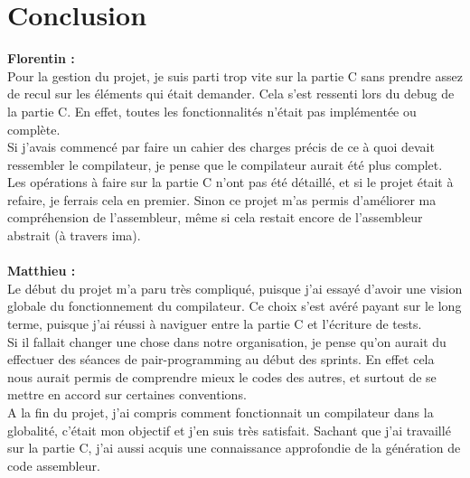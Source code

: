 \documentclass{article}
\begin{document}
\section{Conclusion}
\textbf{Florentin : } \\ 
Pour la gestion du projet, je suis parti trop vite sur la partie C sans prendre assez de recul sur les éléments qui était demander. Cela s’est ressenti lors du debug de la partie C. En effet, toutes les fonctionnalités n’était pas implémentée ou complète. \\ 
Si j’avais commencé par faire un cahier des charges précis de ce à quoi devait ressembler le compilateur, je pense que le compilateur aurait été plus complet. Les opérations à faire sur la partie C n’ont pas été détaillé, et si le projet était à refaire, je ferrais cela en premier.
Sinon ce projet m’as permis d’améliorer ma compréhension de l’assembleur, même si cela restait encore de l’assembleur abstrait (à travers ima). \\ \\
\textbf{Matthieu : } \\
Le début du projet m'a paru très compliqué, puisque j'ai essayé d'avoir une vision globale du fonctionnement du compilateur. Ce choix s'est avéré payant sur le long terme, puisque j'ai réussi à naviguer entre la partie C et l'écriture de tests.\\
Si il fallait changer une chose dans notre organisation, je pense qu'on aurait du effectuer des séances de pair-programming au début des sprints. En effet cela nous aurait permis de comprendre mieux le codes des autres, et surtout de se mettre en accord sur certaines conventions. \\
A la fin du projet, j'ai compris comment fonctionnait un compilateur dans la globalité, c'était mon objectif et j'en suis très satisfait. Sachant que j'ai travaillé sur la partie C, j'ai aussi acquis une connaissance approfondie de la génération de code assembleur. 
\end{document}
